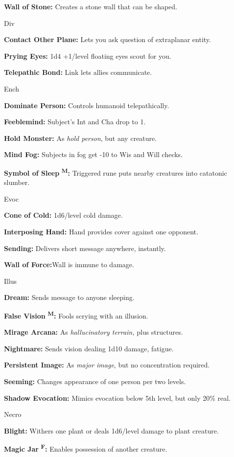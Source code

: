 \documentclass{article}
\begin{document}
\textbf{Wall of Stone:} Creates a stone wall that can be shaped.

Div

\textbf{Contact Other Plane:} Lets you ask question of extraplanar entity.

\textbf{Prying Eyes:} 1d4 +1/level floating eyes scout for you.

\textbf{Telepathic Bond:} Link lets allies communicate.

Ench

\textbf{Dominate Person:} Controls humanoid telepathically.

\textbf{Feeblemind:} Subject's Int and Cha drop to 1.

\textbf{Hold Monster:} As \textit{hold person}, but any creature.

\textbf{Mind Fog:} Subjects in fog get -10 to Wis and Will checks.

\textbf{Symbol of Sleep }\textsuperscript{\textbf{M}}\textbf{:} Triggered rune 
puts nearby creatures into catatonic slumber.

Evoc

\textbf{Cone of Cold:} 1d6/level cold damage.

\textbf{Interposing Hand:} Hand provides cover against one opponent.

\textbf{Sending:} Delivers short message anywhere, instantly.

\textbf{Wall of Force:}Wall is immune to damage.

Illus

\textbf{Dream:} Sends message to anyone sleeping.

\textbf{False Vision }\textsuperscript{\textbf{M}}\textbf{:} Fools scrying with 
an illusion.

\textbf{Mirage Arcana:} As \textit{hallucinatory terrain, }plus structures.

\textbf{Nightmare:} Sends vision dealing 1d10 damage, fatigue.

\textbf{Persistent Image:} As \textit{major image}, but no concentration required.

\textbf{Seeming:} Changes appearance of one person per two levels.

\textbf{Shadow Evocation:} Mimics evocation below 5th level, but only 20\% real.

Necro

\textbf{Blight:} Withers one plant or deals 1d6/level damage to plant creature.

\textbf{Magic Jar }\textsuperscript{\textbf{F}}\textbf{:} Enables possession of 
another creature.
\end{document}
